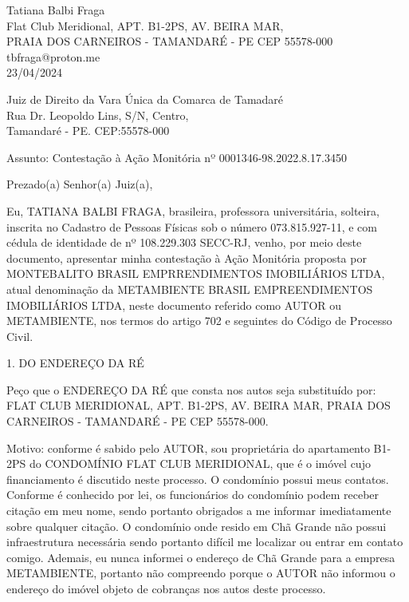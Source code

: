 \documentclass[11pt]{letter}
\begin{document}

Tatiana Balbi Fraga \\
Flat Club Meridional, APT. B1-2PS, AV. BEIRA MAR,  \\
PRAIA DOS CARNEIROS - TAMANDARÉ - PE CEP 55578-000 \\
tbfraga@proton.me \\

23/04/2024

Juiz de Direito da Vara Única da Comarca de Tamadaré \\
Rua Dr. Leopoldo Lins, S/N, Centro, \\
Tamandaré - PE. CEP:55578-000

Assunto: Contestação à Ação Monitória nº 0001346-98.2022.8.17.3450

Prezado(a) Senhor(a) Juiz(a),

Eu, TATIANA BALBI FRAGA,
brasileira, professora universitária, solteira, inscrita no Cadastro de Pessoas Físicas sob o número 073.815.927-11, e com cédula de identidade de nº 108.229.303 SECC-RJ, venho, por meio deste documento, apresentar minha contestação à Ação Monitória proposta por MONTEBALITO BRASIL EMPRRENDIMENTOS IMOBILIÁRIOS LTDA, atual
denominação da METAMBIENTE BRASIL EMPREENDIMENTOS IMOBILIÁRIOS LTDA, neste documento referido como AUTOR ou METAMBIENTE, nos termos do artigo 702 e seguintes do Código de Processo Civil.

1. DO ENDEREÇO DA RÉ

Peço que o ENDEREÇO DA RÉ que consta nos autos seja substituído por: FLAT CLUB MERIDIONAL, APT. B1-2PS, AV. BEIRA MAR, PRAIA DOS CARNEIROS - TAMANDARÉ - PE CEP 55578-000. 

Motivo: conforme é sabido pelo AUTOR, sou proprietária do apartamento B1-2PS do CONDOMÍNIO FLAT CLUB MERIDIONAL, que é o imóvel cujo financiamento é discutido neste processo. O condomínio possui meus contatos. Conforme é conhecido por lei, os funcionários do condomínio podem receber citação em meu nome, sendo portanto obrigados a me informar imediatamente sobre qualquer citação. O condomínio onde resido em Chã Grande não possui infraestrutura necessária sendo portanto difícil me localizar ou entrar em contato comigo. Ademais, eu nunca informei o endereço de Chã Grande para a empresa METAMBIENTE, portanto não compreendo porque o AUTOR não informou o endereço do imóvel objeto de cobranças nos autos deste processo. 
\end{document}

